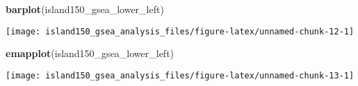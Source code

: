 \documentclass[
]{article}
\newenvironment{Shaded}{\begin{snugshade}}{\end{snugshade}}
\newcommand{\KeywordTok}[1]{\textcolor[rgb]{0.13,0.29,0.53}{\textbf{#1}}}
\newcommand{\NormalTok}[1]{#1}
\begin{document}
\begin{Shaded}
\begin{Highlighting}[]
\KeywordTok{barplot}\NormalTok{(island150_gsea_lower_left)}
\end{Highlighting}
\end{Shaded}

\texttt{[image: island150\_gsea\_analysis\_files/figure-latex/unnamed-chunk-12-1]}

\begin{Shaded}
\begin{Highlighting}[]
\KeywordTok{emapplot}\NormalTok{(island150_gsea_lower_left)}
\end{Highlighting}
\end{Shaded}

\texttt{[image: island150\_gsea\_analysis\_files/figure-latex/unnamed-chunk-13-1]}
\end{document}
